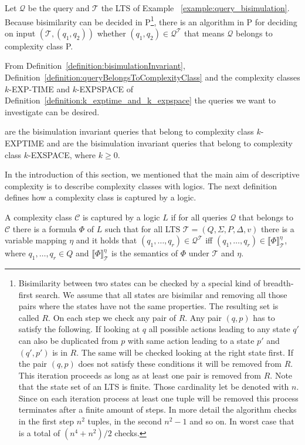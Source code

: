 \begin{example}{\cite{lange2014capturing}}
    Let $\mathcal{Q}$ be the query and $\mathcal{T}$ the LTS of Example~
    \ref{example:query_bisimulation}. Because bisimilarity can be decided in P\footnote{Bisimilarity between two states can be checked by a special kind of breadth-first search. We assume that all states are bisimilar and removing all those pairs where the states have not 
    the same properties. The resulting set is called $R$. On each step we check any pair of $R$. Any pair $(q, p)$ has to satisfy the following. If looking at $q$ all possible actions leading to any state $q'$ can also be duplicated from $p$ with same action leading to a state $p'$ and $(q', p')$ is in $R$. The same will be checked looking 
    at the right state first. If the pair $(q, p)$ does not satisfy these conditions it will be removed from $R$. This 
    iteration proceeds as long as at least one pair is removed from $R$. Note that the state set of an LTS is finite. Those cardinality let be denoted with $n$. Since on each iteration process at least one tuple will be removed this process terminates after a finite amount of steps. In more detail the algorithm checks in the first step $n^2$ tuples, in the second $n^2 - 1$ and so on. In worst case that is a total of $(n^4 + n^2)/2$ checks.}, 
    there is an 
    algorithm in P for deciding on input $(\mathcal{T}, (q_1, q_2))$ whether $(q_1, q_2) \in 
    \mathcal{Q}^\mathcal{T}$ that means $\mathcal{Q}$ belongs to 
    complexity class P.
\end{example}

From Definition~\ref{definition:bisimulationInvariant}, Definition~\ref{definition:queryBelongsToComplexityClass}
and the complexity classes $k$-EXP-TIME and $k$-EXPSPACE of Definition~\ref{definition:k_exptime_and_k_expspace}
the queries we want to investigate can be desired.

\begin{definition}
    \label{definition:kExptimekExpspace}
     are the bisimulation invariant queries that belong to complexity class $k$-EXPTIME and
     are the bisimulation invariant queries that belong to complexity class $k$-EXSPACE, where $k \geq 0$.
\end{definition}

In the introduction of this section, we mentioned that the main aim of descriptive complexity is to describe complexity classes with logics. The next definition defines how a complexity class is captured by a logic. 

\begin{definition}
A complexity class $\mathcal{C}$ is captured by a logic $L$ if for all queries $\mathcal{Q}$ that belongs to $\mathcal{C}$ there is a formula $\Phi$ of $L$ such that for all LTS $\mathcal{T} = (Q, \Sigma, P, \Delta, v)$ there is a variable mapping $\eta$ and it holds that $(q_1, \dots, q_{r}) \in \mathcal{Q}^\mathcal{T}$ iff $(q_1, \dots, q_{r}) \in \llbracket \Phi \rrbracket^\eta_\mathcal{T}$, where $q_1, \dots, q_r \in Q$ and $\llbracket \Phi \rrbracket^\eta_\mathcal{T}$ is the semantics of $\Phi$ under $\mathcal{T}$ and $\eta$.
\end{definition}

